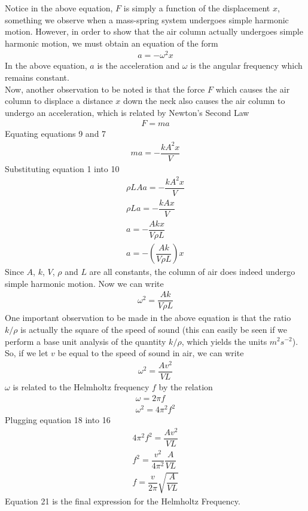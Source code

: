 \documentclass[10pt, a4paper]{article}
\begin{document}
Notice in the above equation, $F$ is simply a function of the displacement $x$, something we observe when a mass-spring system undergoes simple harmonic motion. However, in order to show that the air column actually undergoes simple harmonic motion, we must obtain an equation of the form 
\begin{align}
    a = -\omega^2 x
\end{align}
In the above equation, $a$ is the acceleration and $\omega$ is the angular frequency which remains constant. \\
Now, another observation to be noted is that the force $F$ which causes the air column to displace a distance $x$ down the neck also causes the air column to undergo an acceleration, which is related by Newton's Second Law
\begin{align}
    F = ma 
\end{align}
Equating equations 9 and 7
\begin{align}
ma = -\dfrac{k A^2 x}{V}
\end{align}
Substituting equation 1 into 10
\begin{align}
    \rho L A a = -\dfrac{k A^2 x}{V} \\
    \rho L a = -\dfrac{k A x}{V} \\
    a = -\dfrac{A k x}{V \rho L} \\
    a = -\left(\dfrac{A k}{V \rho L}\right)x
\end{align}
Since $A$, $k$, $V$, $\rho$ and $L$ are all constants, the column of air does indeed undergo simple harmonic motion. Now we can write 
\begin{align}
    \omega^2 = \dfrac{A k}{V \rho L}
\end{align}
One important observation to be made in the above equation is that the ratio $k/\rho$ is actually the square of the speed of sound (this can easily be seen if we perform a base unit analysis of the quantity $k/\rho$, which yields the units $m^2s^{-2}$). So, if we let $v$ be equal to the speed of sound in air, we can write 
\begin{align}
    \omega^2 = \dfrac{A v^2}{V L}
\end{align}
$\omega$ is related to the Helmholtz frequency $f$ by the relation 
\begin{align}
    \omega = 2 \pi f \\
    \omega^2 = 4 \pi^2 f^2
\end{align}
Plugging equation 18 into 16
\begin{align}
    4 \pi^2 f^2 = \dfrac{A v^2}{V L} \\
    f^2 = \dfrac{v^2}{4 \pi^2} \dfrac{A}{V L} \\
    \boxed{f = \dfrac{v}{2 \pi} \sqrt{\dfrac{A}{V L}}}
\end{align}
Equation 21 is the final expression for the Helmholtz Frequency.
\end{document}
